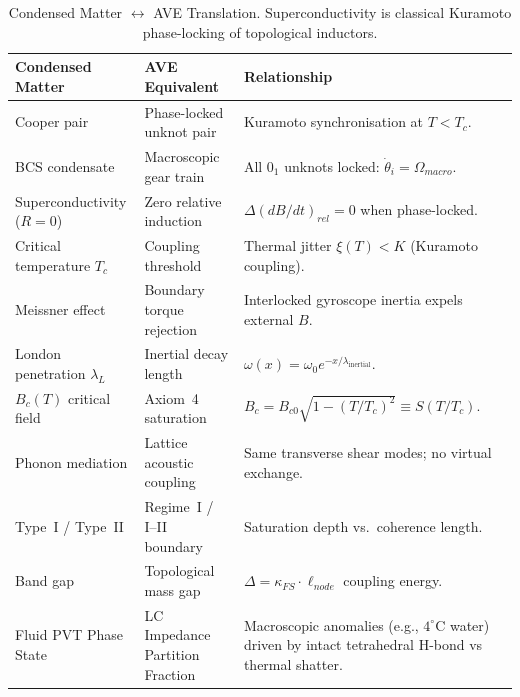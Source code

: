 %

\begin{table}[H]
\centering
\caption{Condensed Matter $\leftrightarrow$ AVE Translation.  Superconductivity is classical Kuramoto phase-locking of topological inductors.}
\label{tab:trans_condensed}
\small
\renewcommand{\arraystretch}{1.3}
\begin{tabularx}{\textwidth}{@{}p{3.8cm} p{4.0cm} X@{}}
\toprule
\textbf{Condensed Matter} & \textbf{AVE Equivalent} & \textbf{Relationship} \\
\midrule
Cooper pair & Phase-locked unknot pair & Kuramoto synchronisation at $T < T_c$. \\
BCS condensate & Macroscopic gear train & All $0_1$ unknots locked: $\dot{\theta}_i = \Omega_{macro}$. \\
Superconductivity ($R=0$) & Zero relative induction & $\Delta(dB/dt)_{rel} = 0$ when phase-locked. \\
Critical temperature $T_c$ & Coupling threshold & Thermal jitter $\xi(T) < K$ (Kuramoto coupling). \\
Meissner effect & Boundary torque rejection & Interlocked gyroscope inertia expels external $B$. \\
London penetration $\lambda_L$ & Inertial decay length & $\omega(x) = \omega_0 e^{-x/\lambda_\text{inertial}}$. \\
$B_c(T)$ critical field & Axiom~4 saturation & $B_c = B_{c0}\sqrt{1-(T/T_c)^2} \equiv S(T/T_c)$. \\
Phonon mediation & Lattice acoustic coupling & Same transverse shear modes; no virtual exchange. \\
Type~I / Type~II & Regime~I / I--II boundary & Saturation depth vs.\ coherence length. \\
Band gap & Topological mass gap & $\Delta = \kappa_{FS} \cdot \ell_{node}$ coupling energy. \\
Fluid PVT Phase State & LC Impedance Partition Fraction & Macroscopic anomalies (e.g., $4^\circ$C water) driven by intact tetrahedral H-bond vs thermal shatter. \\
\bottomrule
\end{tabularx}
\end{table}

